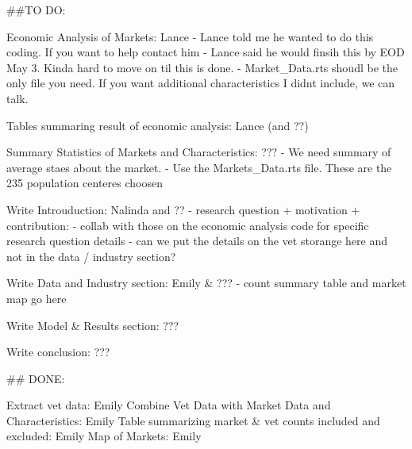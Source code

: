 ##TO DO:

Economic Analysis of Markets: Lance
    - Lance told me he wanted to do this coding. If you want to help contact him
    - Lance said he would finsih this by EOD May 3. Kinda hard to move on til this is done. 
    - Market_Data.rts shoudl be the only file you need. If you want additional characteristics I didnt include, we can talk. 

Tables summaring result of economic analysis: Lance (and ??)

Summary Statistics of Markets and Characteristics: ???
    - We need summary of average staes about the market. 
    - Use the Markets_Data.rts file. These are the 235 population centeres choosen

Write Introuduction: Nalinda and ??
    - research question + motivation + contribution: 
    - collab with those on the economic analysis code for specific research question details 
    - can we put the details on the vet storange here and not in the data / industry section? 

Write Data and Industry section: Emily & ???
    - count summary table and market map go here 

Write Model & Results section: ???

Write conclusion:  ???

## DONE: 

Extract vet data: Emily 
Combine Vet Data with Market Data and Characteristics: Emily 
Table summarizing market & vet counts included and excluded: Emily
Map of Markets: Emily 

